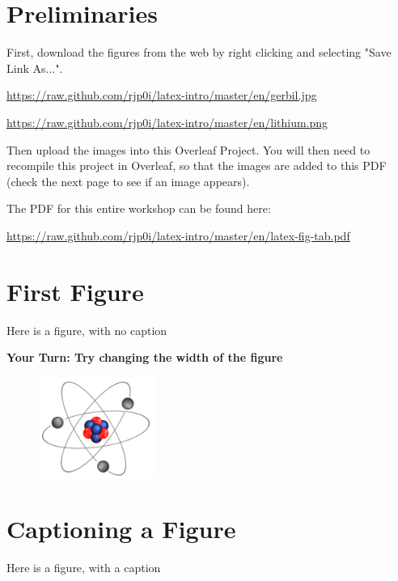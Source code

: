 \documentclass{article}
\begin{document}
\section{Preliminaries}
\large
First, download the figures from the web by right clicking and selecting "Save Link As...".
\bigskip

\url{https://raw.github.com/rjp0i/latex-intro/master/en/gerbil.jpg}

\url{https://raw.github.com/rjp0i/latex-intro/master/en/lithium.png}




\medskip

Then upload the images into this Overleaf Project. You will then need to recompile this project in Overleaf, so that the images are added to this PDF (check the next page to see if an image appears).
\bigskip

\bigskip


The PDF for this entire workshop can be found here:


 \url{https://raw.github.com/rjp0i/latex-intro/master/en/latex-fig-tab.pdf}



\clearpage
\section{First Figure}

Here is a figure, with no caption
\medskip

{\bf Your Turn: Try changing the width of the figure}

\begin{figure}
\centering   %
\includegraphics[width=1.5in]{lithium.png} %
\end{figure}
\clearpage
\section{Captioning a Figure}
Here is a figure, with a caption
\end{document}
